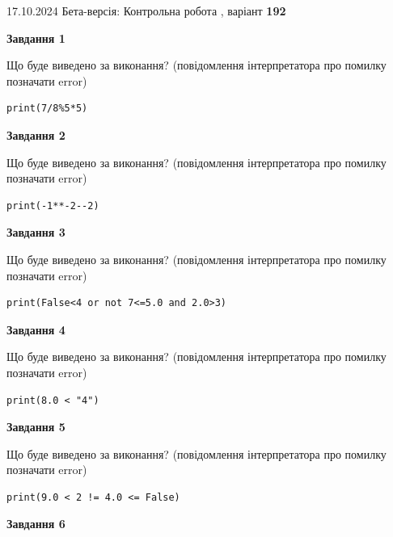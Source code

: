 \documentclass[12pt, ukrainian]{article}
\begin{document}
{\Large{17.10.2024 Бета-версія: Контрольна робота , варіант  \No \textbf { 192 }\par}}
{
\begin {large}
{\begin {center}\textbf{Завдання 1}\end {center}}

Що буде виведено за виконання? (повідомлення інтерпретатора про помилку позначати error)\par
\begin{verbatim}
print(7/8%5*5)
\end{verbatim}

{\begin {center}\textbf{Завдання 2}\end {center}}

Що буде виведено за виконання? (повідомлення інтерпретатора про помилку позначати error)\par
\begin{verbatim}
print(-1**-2--2)
\end{verbatim}

{\begin {center}\textbf{Завдання 3}\end {center}}

Що буде виведено за виконання? (повідомлення інтерпретатора про помилку позначати error)\par
\begin{verbatim}
print(False<4 or not 7<=5.0 and 2.0>3)
\end{verbatim}

{\begin {center}\textbf{Завдання 4}\end {center}}

Що буде виведено за виконання? (повідомлення інтерпретатора про помилку позначати error)\par
\begin{verbatim}
print(8.0 < "4")
\end{verbatim}

{\begin {center}\textbf{Завдання 5}\end {center}}

Що буде виведено за виконання? (повідомлення інтерпретатора про помилку позначати error)\par
\begin{verbatim}
print(9.0 < 2 != 4.0 <= False)
\end{verbatim}

{\begin {center}\textbf{Завдання 6}\end {center}}


\end{large}}
\end{document}
